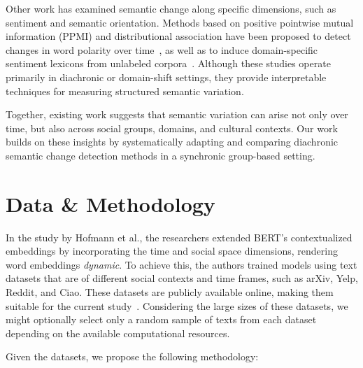 \documentclass[conference]{IEEEtran}
\begin{document}
Other work has examined semantic change along specific dimensions, such as sentiment and semantic orientation. Methods based on positive pointwise mutual information (PPMI) and distributional association have been proposed to detect changes in word polarity over time~\cite{cook2010automatically}, as well as to induce domain-specific sentiment lexicons from unlabeled corpora~\cite{hamilton2016inducing}. Although these studies operate primarily in diachronic or domain-shift settings, they provide interpretable techniques for measuring structured semantic variation.

Together, existing work suggests that semantic variation can arise not only over time, but also across social groups, domains, and cultural contexts. Our work builds on these insights by systematically adapting and comparing diachronic semantic change detection methods in a synchronic group-based setting.

\section{Data \& Methodology}

In the study by Hofmann et al., the researchers extended BERT's contextualized embeddings by incorporating the time and social space dimensions, rendering word embeddings \textit{dynamic}. To achieve this, the authors trained models using text datasets that are of different social contexts and time frames, such as arXiv, Yelp, Reddit, and Ciao. These datasets are publicly available online, making them suitable for the current study~\cite{hofmann2021dcwe}. Considering the large sizes of these datasets, we might optionally select only a random sample of texts from each dataset depending on the available computational resources.

Given the datasets, we propose the following methodology:
\end{document}
